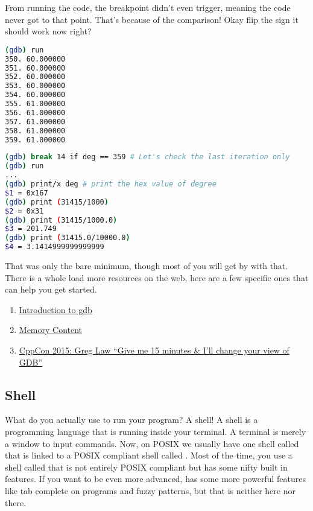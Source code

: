 From running the code, the breakpoint didn't even trigger, meaning the code never got to that point. That’s because of the comparison! Okay flip the sign it should work now right?

\begin{lstlisting}[language=bash]
(gdb) run
350. 60.000000
351. 60.000000
352. 60.000000
353. 60.000000
354. 60.000000
355. 61.000000
356. 61.000000
357. 61.000000
358. 61.000000
359. 61.000000

\end{lstlisting}

\begin{lstlisting}[language=bash]
(gdb) break 14 if deg == 359 # Let's check the last iteration only
(gdb) run
...
(gdb) print/x deg # print the hex value of degree
$1 = 0x167
(gdb) print (31415/1000)
$2 = 0x31
(gdb) print (31415/1000.0)
$3 = 201.749
(gdb) print (31415.0/10000.0)
$4 = 3.1414999999999999

\end{lstlisting}

That was only the bare minimum, though most of you will get by with that.
There is a whole load more resources on the web, here are a few specific ones that can help you get started.

\begin{enumerate}
\item \href{http://www.cs.cmu.edu/~gilpin/tutorial/}{Introduction to gdb}
\item \href{http://www.delorie.com/gnu/docs/gdb/gdb\_56.html}{Memory Content}
\item \href{https://www.youtube.com/watch?v=PorfLSr3DDI}{CppCon 2015: Greg Law “Give me 15 minutes & I'll change your view of GDB”}
\end{enumerate}

\subsection{Shell}

What do you actually use to run your program? A shell! A shell is a programming language that is running inside your terminal. A terminal is merely a window to input commands. Now, on POSIX we usually have one shell called  that is linked to a POSIX compliant shell called . Most of the time, you use a shell called  that is not entirely POSIX compliant but has some nifty built in features. If you want to be even more advanced,  has some more powerful features like tab complete on programs and fuzzy patterns, but that is neither here nor there.

